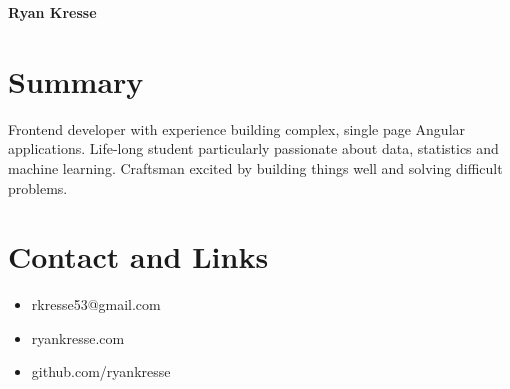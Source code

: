 \documentclass[10pt]{article}
\begin{document}
	\begin{flushleft}
		\textbf{{\Huge Ryan Kresse}}
	\end{flushleft}	%
	
	
	\begin{comment}
		\renewcommand{\abstractname}{Summary}
	
		\begin{abstract}
			Frontend developer with experience building complex, single page Angular applications. Life-long student particularly passionate about data, statistics and machine learning. Craftsman excited by building things well and solving difficult
		problems.
		\end{abstract}
	\end{comment}
	\section{Summary}
		Frontend developer with experience building complex, single page Angular applications. Life-long student particularly passionate about data, statistics and machine learning. Craftsman excited by building things well and solving difficult
		problems.
	
	\section{Contact and Links}
		\begin{itemize}[noitemsep]
			\item rkresse53@gmail.com
			\item ryankresse.com
			\item github.com/ryankresse
		\end{itemize}
	
	
\end{document}
